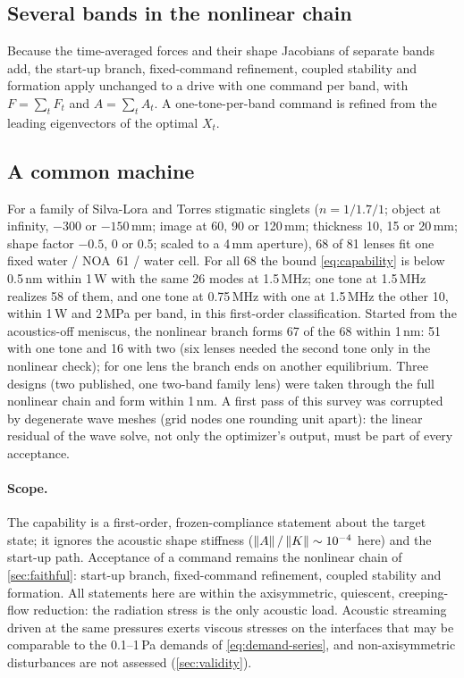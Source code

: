 \subsection{Several bands in the nonlinear chain}
Because the time-averaged forces and their shape Jacobians of separate bands
add, the start-up branch, fixed-command refinement, coupled stability and
formation apply unchanged to a drive with one command per band, with
$F=\sum_tF_t$ and $A=\sum_tA_t$. A one-tone-per-band command is refined from
the leading eigenvectors of the optimal $X_t$.

\subsection{A common machine}
For a family of Silva-Lora and Torres stigmatic singlets \cite{silva2020}
($n=1/1.7/1$; object at infinity, $-300$ or $-150$\,mm; image at 60, 90 or
120\,mm; thickness 10, 15 or 20\,mm; shape factor $-0.5$, 0 or 0.5; scaled to
a 4\,mm aperture), 68 of 81 lenses fit one fixed water / NOA~61 / water cell.
For all 68 the bound \cref{eq:capability} is below 0.5\,nm within 1\,W with
the same 26 modes at 1.5\,MHz; one tone at 1.5\,MHz realizes 58 of them, and
one tone at 0.75\,MHz with one at 1.5\,MHz the other 10, within 1\,W and
2\,MPa per band, in this first-order classification. Started from the
acoustics-off meniscus, the nonlinear branch forms 67 of the 68 within
1\,nm: 51 with one tone and 16 with two (six lenses needed the second tone
only in the nonlinear check); for one lens the branch ends on another
equilibrium. Three designs (two published, one two-band family lens) were
taken through the full nonlinear chain and form within 1\,nm.
A first pass of this survey was corrupted by degenerate wave meshes (grid
nodes one rounding unit apart): the linear residual of the wave solve, not
only the optimizer's output, must be part of every acceptance.

\paragraph{Scope.} The capability is a first-order, frozen-compliance statement
about the target state; it ignores the acoustic shape stiffness
($\left\lVert A\right\rVert/\left\lVert K\right\rVert\sim10^{-4}$ here) and the start-up path. Acceptance of a
command remains the nonlinear chain of \cref{sec:faithful}: start-up branch,
fixed-command refinement, coupled stability and formation. All statements
here are within the axisymmetric, quiescent, creeping-flow reduction: the
radiation stress is the only acoustic load. Acoustic streaming driven at the
same pressures exerts viscous stresses on the interfaces that may be
comparable to the 0.1--1\,Pa demands of \cref{eq:demand-series}, and
non-axisymmetric disturbances are not assessed (\cref{sec:validity}).
